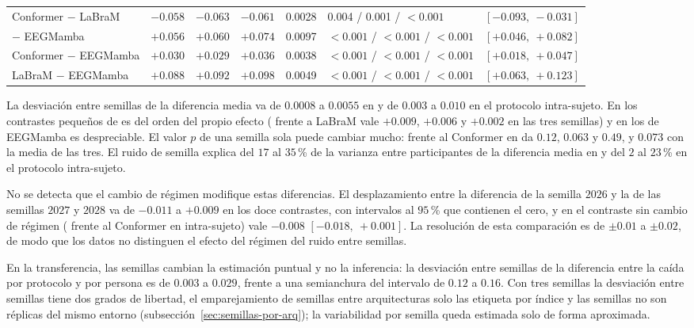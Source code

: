 \begin{table}[H]
{\begin{tabular}{lccccll}
Conformer $-$ LaBraM & $-0.058$ & $-0.063$ & $-0.061$ & 0.0028 & 0.004 / 0.001 / $<0.001$ & $[-0.093,\ -0.031]$ \\
\eegnet{} $-$ EEGMamba & $+0.056$ & $+0.060$ & $+0.074$ & 0.0097 & $<0.001$ / $<0.001$ / $<0.001$ & $[+0.046,\ +0.082]$ \\
Conformer $-$ EEGMamba & $+0.030$ & $+0.029$ & $+0.036$ & 0.0038 & $<0.001$ / $<0.001$ / $<0.001$ & $[+0.018,\ +0.047]$ \\
LaBraM $-$ EEGMamba & $+0.088$ & $+0.092$ & $+0.098$ & 0.0049 & $<0.001$ / $<0.001$ / $<0.001$ & $[+0.063,\ +0.123]$ \\
\bottomrule
\end{tabular}
}
\end{table}

La desviación entre semillas de la diferencia media va de $0.0008$ a $0.0055$ en \loso{} y de $0.003$ a
$0.010$ en el protocolo intra-sujeto. En los contrastes pequeños de \loso{} es del orden del propio
efecto (\eegnet{} frente a LaBraM vale $+0.009$, $+0.006$ y $+0.002$ en las tres semillas) y en los de
EEGMamba es despreciable. El valor $p$ de una semilla sola puede cambiar mucho: \eegnet{} frente al
Conformer en \loso{} da $0.12$, $0.063$ y $0.49$, y $0.073$ con la media de las tres. El ruido de semilla
explica del $17$ al $35$\,\% de la varianza entre participantes de la diferencia media en \loso{} y del
$2$ al $23$\,\% en el protocolo intra-sujeto.

No se detecta que el cambio de régimen modifique estas diferencias. El desplazamiento entre la diferencia
de la semilla $2026$ y la de las semillas $2027$ y $2028$ va de $-0.011$ a $+0.009$ en los doce contrastes,
con intervalos al $95$\,\% que contienen el cero, y en el contraste sin cambio de régimen (\eegnet{}
frente al Conformer en intra-sujeto) vale $-0.008$ $[-0.018,\ +0.001]$. La resolución de esta comparación
es de $\pm 0.01$ a $\pm 0.02$, de modo que los datos no distinguen el efecto del régimen del ruido
entre semillas.

En la transferencia, las semillas cambian la estimación puntual y no la inferencia: la desviación entre
semillas de la diferencia entre la caída por protocolo y por persona es de $0.003$ a $0.029$, frente a
una semianchura del intervalo de $0.12$ a $0.16$. Con tres semillas la desviación entre semillas tiene
dos grados de libertad, el emparejamiento de semillas entre arquitecturas solo las etiqueta por índice y
las semillas no son réplicas del mismo entorno (subsección~\ref{sec:semillas-por-arq}); la variabilidad por
semilla queda estimada solo de forma aproximada.

